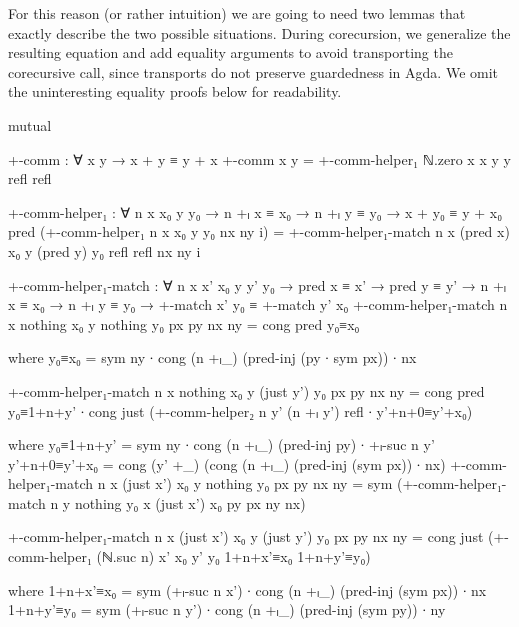 For this reason (or rather intuition) we are going to need two lemmas that
exactly describe the two possible situations. During corecursion, we generalize
the resulting equation and add equality arguments to avoid transporting the
corecursive call, since transports do not preserve guardedness in Agda. We omit
the uninteresting equality proofs below for readability.
\begin{AgdaSuppressSpace}
\begin{code}[hide]
mutual
\end{code}
\begin{code}
  +-comm : ∀ x y → x + y ≡ y + x
  +-comm x y = +-comm-helper₁ ℕ.zero x x y y refl refl

  +-comm-helper₁ :
    ∀ n x x₀ y y₀ → n +ₗ x ≡ x₀ → n +ₗ y ≡ y₀ →
    x + y₀ ≡ y + x₀
  pred (+-comm-helper₁ n x x₀ y y₀ nx ny i) =
    +-comm-helper₁-match n x (pred x) x₀ y (pred y) y₀
      refl refl nx ny i

  +-comm-helper₁-match :
    ∀ n x x' x₀ y y' y₀ →
    pred x ≡ x' → pred y ≡ y' →
    n +ₗ x ≡ x₀ → n +ₗ y ≡ y₀ →
    +-match x' y₀ ≡ +-match y' x₀
  +-comm-helper₁-match
    n x nothing x₀ y nothing y₀ px py nx ny =
      cong pred y₀≡x₀
\end{code}
\begin{code}[hide]
      where
      y₀≡x₀ = sym ny ∙ cong (n +ₗ_) (pred-inj (py ∙ sym px)) ∙ nx
\end{code}
\begin{code}
  +-comm-helper₁-match
    n x nothing x₀ y (just y') y₀ px py nx ny =
      cong pred y₀≡1+n+y' ∙
      cong just
        (+-comm-helper₂ n y' (n +ₗ y') refl ∙ y'+n+0≡y'+x₀)
\end{code}
\begin{code}[hide]
    where
    y₀≡1+n+y' = sym ny ∙ cong (n +ₗ_) (pred-inj py) ∙ +ₗ-suc n y'
    y'+n+0≡y'+x₀ = cong (y' +_) (cong (n +ₗ_) (pred-inj (sym px)) ∙ nx)
  +-comm-helper₁-match
    n x (just x') x₀ y nothing y₀ px py nx ny =
      sym (+-comm-helper₁-match n y nothing y₀ x (just x') x₀ py px ny nx)
\end{code}
\begin{code}
  +-comm-helper₁-match
    n x (just x') x₀ y (just y') y₀ px py nx ny =
      cong just
        (+-comm-helper₁ (ℕ.suc n) x' x₀ y' y₀
          1+n+x'≡x₀ 1+n+y'≡y₀)
\end{code}
\begin{code}[hide]
    where
    1+n+x'≡x₀ = sym (+ₗ-suc n x') ∙ cong (n +ₗ_) (pred-inj (sym px)) ∙ nx
    1+n+y'≡y₀ = sym (+ₗ-suc n y') ∙ cong (n +ₗ_) (pred-inj (sym py)) ∙ ny
\end{code}
\end{AgdaSuppressSpace}

